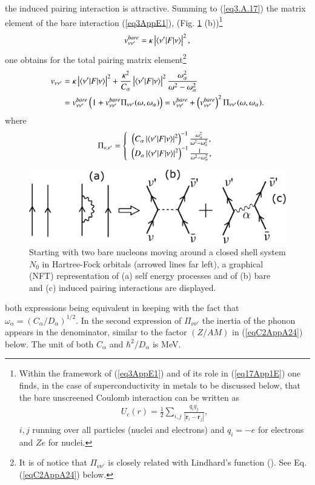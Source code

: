 \begin{subappendices}
 the induced pairing interaction is attractive.
Summing to (\ref{eq3.A.17}) the matrix element of the bare interaction (\ref{eq3AppE1}), (Fig. \ref{fig3_A_3} (b))\footnote{Within the framework of (\ref{eq3AppE1}) and of its role in (\ref{eq17App1E}) one finds, in the case of superconductivity in metals to be discussed below,  that the bare unscreened Coulomb interaction can be written as 
	\begin{align*}
	U_c(r)=\frac{1}{2}\sum_{i,j}\frac{q_iq_j}{|\mathbf r_i-\mathbf r_j|}, 
	\end{align*}
	$i,j$ running over all particles (nuclei and electrons) and $q_i=-e$ for electrons and $Ze$ for nuclei.}
\begin{align}
v_{\nu\nu'}^{bare}=\kappa\left|\langle {\nu'|F|\nu} \rangle\right|^2,
\end{align}
one obtains for the total pairing matrix element\footnote{It is of notice that $\Pi_{\nu\nu'}$ is closely related with Lindhard's function (\cite{Lindhard:53}). See Eq. (\ref{eqC2AppA24}) below.}
\begin{align}\label{eq17App1E}
\nonumber v_{\nu\nu'}&=\kappa\left|\langle {\nu'|F|\nu} \rangle\right|^2+\frac{\kappa^2}{C_\alpha}\left|\langle {\nu'|F|\nu} \rangle\right|^2\frac{\omega_\alpha^2}{\omega^2-\omega_\alpha^2}\\
&=v_{\nu\nu'}^{bare}\left(1+v_{\nu\nu'}^{bare}\Pi_{\nu\nu'}(\omega,\omega_\alpha)\right)=v^{bare}_{\nu\nu'}+\left(v^{bare}_{\nu\nu'}\right)^2\Pi_{\nu\nu'}(\omega,\omega_\alpha).
\end{align}
where
\begin{align}
\Pi_{\nu,\nu'}=\left\{\begin{array}{c}
 \left(C_\alpha\left|\langle {\nu'|F|\nu} \rangle\right|^2\right)^{-1}\frac{\omega_\alpha^2}{\omega^2-\omega_\alpha^2},\\ 
\left(D_\alpha\left|\langle {\nu'|F|\nu} \rangle\right|^2\right)^{-1}\frac{1}{\omega^2-\omega_\alpha^2},
\end{array}
\right. 
\end{align}
   \begin{figure}
   \centerline{\includegraphics*[width=12cm,angle=0	]{nutshell/figs/fig3_A_3}}
   \caption{Starting with two bare nucleons moving around a closed shell system $N_0$ in Hartree-Fock orbitals (arrowed lines far left), a graphical (NFT) representation of (a) self energy processes and of (b) bare and (c) induced pairing interactions are displayed.}\label{fig3_A_3}
   \end{figure}
both expressions being equivalent in keeping with the fact that $\omega_\alpha=(C_\alpha/D_\alpha)^{1/2}$. In the second expression of $\Pi_{\nu\nu'}$  the inertia of the phonon appears in the denominator, similar to the factor $(Z/AM)$  in (\ref{eqC2AppA24}) below. The unit of both $C_\alpha$ and $\hbar^2/D_\alpha$ is  MeV.


\end{subappendices}
